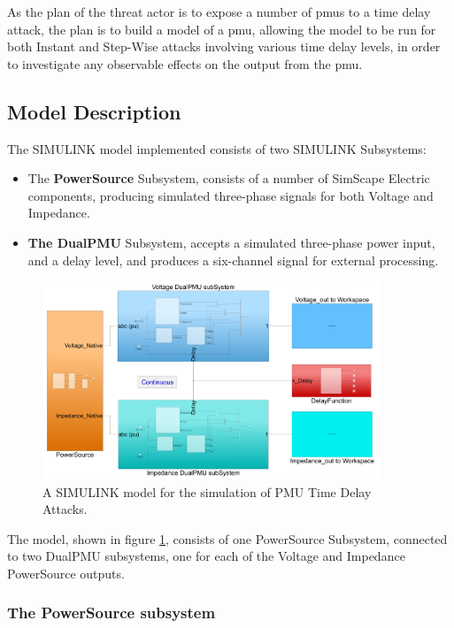 As the plan of the threat actor is to expose  a number of \acrshort{pmu}s to a time  delay attack, the plan is to build a model of a \acrshort{pmu}, allowing the model to be run for both Instant and Step-Wise attacks involving various time delay levels, in order to investigate any observable effects on the output from the \acrshort{pmu}.
\subsection{Model Description}
The SIMULINK model implemented consists of two SIMULINK Subsystems:
\begin{itemize}
    \item The \textbf{PowerSource} Subsystem, consists of a number of SimScape Electric components, producing simulated three-phase signals for both  Voltage and Impedance.
    \item \textbf{The DualPMU} Subsystem, accepts a simulated three-phase power input, and a delay level, and produces a six-channel signal for external processing. 
\end{itemize}

 \begin{figure}[t]
 \begin{center}
\includegraphics[width=0.90\textwidth]{figures/pmuSIM-overviewH.png}
\caption[PmuSIM SIMULINK model]{A SIMULINK model for the simulation of PMU Time Delay Attacks.}
\label{fig:PMUsim-Overview}
     
 \end{center}
\end{figure}

The model, shown in figure \ref{fig:PMUsim-Overview}, consists of one PowerSource Subsystem, connected to two DualPMU subsystems, one for each of the Voltage and Impedance PowerSource outputs.

\subsubsection{The PowerSource subsystem}

